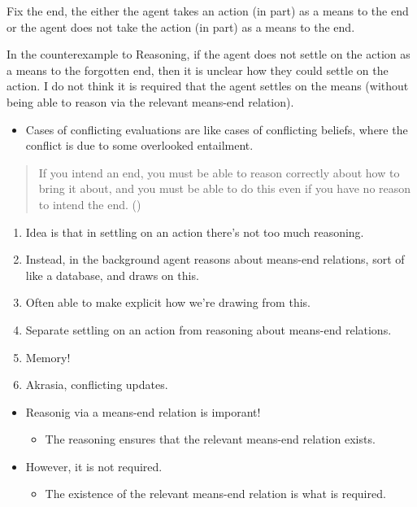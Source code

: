 \documentclass[10pt]{article}
\newcommand{\hand}{\ding{43}}
\newcommand{\hozlinedash}[0]{%
  \noindent\hdashrule[0.5ex][c]{\textwidth}{.1pt}{2.5pt}
}
\newcommand{\schemaName}[1]{\textsf{#1}}
\begin{document}
Fix the end, the either the agent takes an action (in part) as a means to the end or the agent does not take the action (in part) as a means to the end.

In the counterexample to \schemaName{Reasoning}, if the agent does not settle on the action as a means to the forgotten end, then it is unclear how they could settle on the action.
I do not think it is required that the agent settles on the means (without being able to reason via the relevant means-end relation).



\begin{itemize}
\item Cases of conflicting evaluations are like cases of conflicting beliefs, where the conflict is due to some overlooked entailment.
\end{itemize}



\begin{quote}
  If you intend an end, you must be able to reason correctly about how to bring it about, and you must be able to do this even if you have no reason to intend the end.\nolinebreak
  \mbox{}\hfill\mbox{(\citeyear[96]{Broome:2002aa})}
\end{quote}

\hozlinedash

\begin{enumerate}
\item Idea is that in settling on an action there's not too much reasoning.
\item Instead, in the background agent reasons about means-end relations, sort of like a database, and draws on this.
\item Often able to make explicit how we're drawing from this.
\item Separate settling on an action from reasoning about means-end relations.
\item Memory!
\item Akrasia, conflicting updates.
\end{enumerate}


\hozlinedash

\begin{itemize}
\item[\hand] Reasonig via a means-end relation is imporant!
  \begin{itemize}
  \item The reasoning ensures that the relevant means-end relation exists.
  \end{itemize}
\item However, it is not required.
  \begin{itemize}
  \item The existence of the relevant means-end relation is what is required.
  \end{itemize}
\end{itemize}
\end{document}
